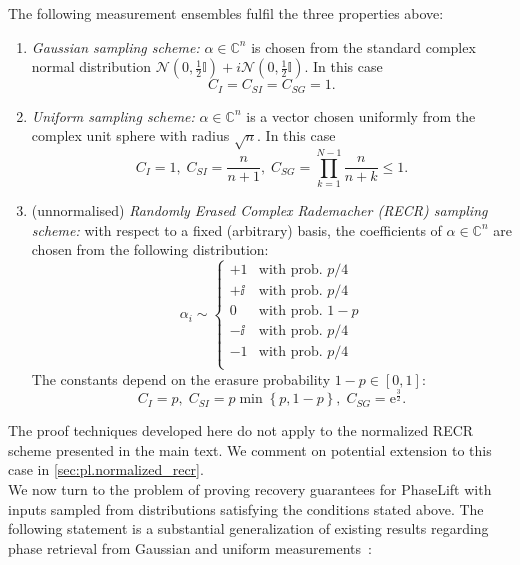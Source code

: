 \begin{proposition}%
  \label{prop:gauss+recr_requirements}
  The following measurement ensembles fulfil the three properties above:
  \begin{enumerate}

    \item \emph{Gaussian sampling scheme:} $\alpha \in \mathbb{C}^n$ is chosen from the standard complex normal distribution $\mathcal{N}(0,\tfrac{1}{2}\mathbb{I})+ i \mathcal{N}(0,\tfrac{1}{2}\mathbb{I})$. In this case
  \[
    C_I = C_{SI} = C_{SG} = 1.
  \]

  \item \emph{Uniform sampling scheme:} $\alpha \in \mathbb{C}^n$ is a vector chosen uniformly from the complex unit sphere with radius $\sqrt{n}$. In this case
  \[
    C_I = 1, \; C_{SI} = \frac{n}{n+1}, \; C_{SG} = \prod_{k=1}^{N-1} \frac{n}{n+k} \leq 1.
  \]

  \item (unnormalised) \emph{Randomly Erased Complex Rademacher (RECR) sampling scheme:} with respect to a fixed (arbitrary) basis, the coefficients of $\alpha \in \mathbb{C}^n$ are chosen from the following distribution:
  \[
  \alpha_i \sim
  \begin{cases}
  +1 & \textrm{with prob. } p/4 \\
  +\ii & \textrm{with prob. } p/4 \\
  0 & \textrm{with prob. } 1-p \\
  -\ii & \textrm{with prob. } p/4 \\
  -1 & \textrm{with prob. } p/4 \\
  \end{cases}
  \label{eq:definition_recr}
  \]
  The constants depend on the erasure probability $1-p \in [0,1]$:
  \[
  C_I = p,\; C_{SI} = p \min \left\{p,1-p \right\}, \; C_{SG} = \mathrm{e}^{\frac{3}{2}}.
  \]
  \end{enumerate}
\end{proposition}


The proof techniques developed here do not apply to the normalized RECR scheme presented in the main text.
We comment on potential extension to this case in \cref{sec:pl.normalized_recr}.\\



We now turn to the problem of proving recovery guarantees for PhaseLift with inputs sampled from distributions satisfying the conditions stated above.
The following statement is a substantial generalization of existing results regarding phase retrieval from Gaussian and uniform measurements~\cite{candes_solving_2012,demanet_stable_2014}:

